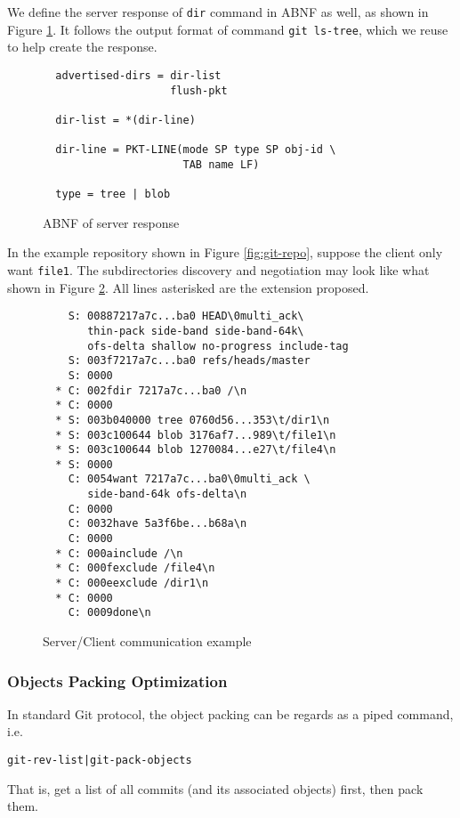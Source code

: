 \documentclass[preprint]{sigplanconf}
\begin{document}
We define the server response of \verb|dir| command in ABNF as well, as shown
in Figure \ref{fig:server-response-ABNF}.
It follows the output format of command \verb|git ls-tree|, which we reuse to
help create the response.
\begin{figure}[htpb]
  \centering
  \begin{verbatim}
  advertised-dirs = dir-list
                    flush-pkt

  dir-list = *(dir-line)

  dir-line = PKT-LINE(mode SP type SP obj-id \
                      TAB name LF)

  type = tree | blob
  \end{verbatim}
  \caption{ABNF of server response}
  \label{fig:server-response-ABNF}
\end{figure}

In the example repository shown in Figure \ref{fig:git-repo}, suppose the
client only want \verb|file1|.
The subdirectories discovery and negotiation may look like what shown in Figure
\ref{fig:c/s-comm}.
All lines asterisked are the extension proposed.

\begin{figure}[htpb]
  \centering
  \begin{verbatim}
    S: 00887217a7c...ba0 HEAD\0multi_ack\
       thin-pack side-band side-band-64k\
       ofs-delta shallow no-progress include-tag
    S: 003f7217a7c...ba0 refs/heads/master
    S: 0000
  * C: 002fdir 7217a7c...ba0 /\n
  * C: 0000
  * S: 003b040000 tree 0760d56...353\t/dir1\n
  * S: 003c100644 blob 3176af7...989\t/file1\n
  * S: 003c100644 blob 1270084...e27\t/file4\n
  * S: 0000
    C: 0054want 7217a7c...ba0\0multi_ack \
       side-band-64k ofs-delta\n
    C: 0000
    C: 0032have 5a3f6be...b68a\n
    C: 0000
  * C: 000ainclude /\n
  * C: 000fexclude /file4\n
  * C: 000eexclude /dir1\n
  * C: 0000
    C: 0009done\n
  \end{verbatim}
  \caption{Server/Client communication example}
  \label{fig:c/s-comm}
\end{figure}

\subsubsection{Objects Packing Optimization}
In standard Git protocol, the object packing can be regards as a piped command,
i.e.
\begin{verbatim}
git-rev-list|git-pack-objects
\end{verbatim}
That is, get a list of all commits (and its associated objects) first, then
pack them.
\end{document}
